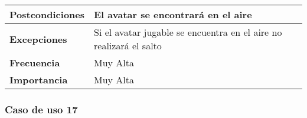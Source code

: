 \begin{longtable}{l|l}
\begin{minipage}{0.25\columnwidth}
\textbf{Postcondiciones} 
\end{minipage}
&
\begin{minipage}{0.65\columnwidth}
El avatar se encontrará en el aire
\end{minipage}
\\ \hline

\begin{minipage}{0.25\columnwidth}
\textbf{Excepciones} 
\end{minipage}
&
\begin{minipage}{0.65\columnwidth}
Si el avatar jugable se encuentra en el aire no realizará el salto 
\end{minipage}
\\ \hline

\begin{minipage}{0.25\columnwidth}
\textbf{Frecuencia} 
\end{minipage}
&
\begin{minipage}{0.65\columnwidth}
Muy Alta
\end{minipage}
\\ \hline

\begin{minipage}{0.25\columnwidth}
\textbf{Importancia} 
\end{minipage}
&
\begin{minipage}{0.65\columnwidth}
Muy Alta
\end{minipage}
\\ \hline
\end{longtable}

\subsubsection{Caso de uso 17}


